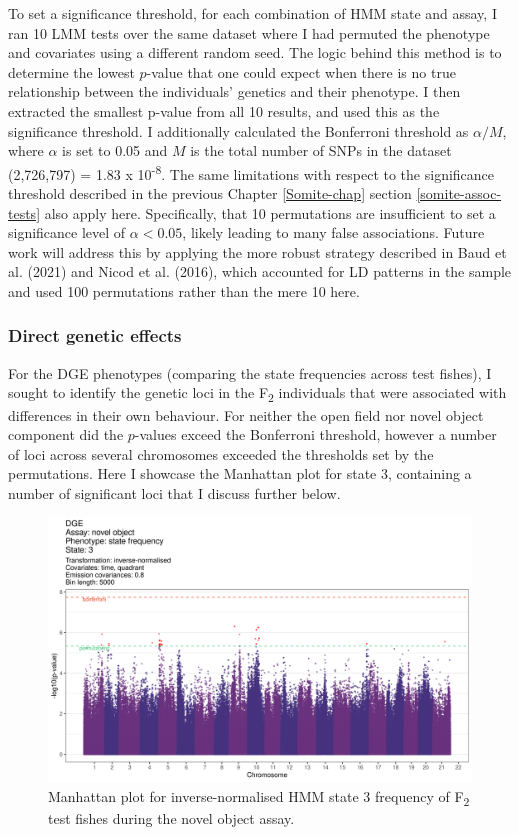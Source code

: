 \documentclass[
]{book}
\begin{document}
To set a significance threshold, for each combination of HMM state and assay, I ran 10 LMM tests over the same dataset where I had permuted the phenotype and covariates using a different random seed. The logic behind this method is to determine the lowest \(p\)-value that one could expect when there is no true relationship between the individuals' genetics and their phenotype. I then extracted the smallest p-value from all 10 results, and used this as the significance threshold. I additionally calculated the Bonferroni threshold as \(\alpha / M\), where \(\alpha\) is set to 0.05 and \(M\) is the total number of SNPs in the dataset (2,726,797) = 1.83 x 10\textsuperscript{-8}. The same limitations with respect to the significance threshold described in the previous Chapter \ref{Somite-chap} section \ref{somite-assoc-tests} also apply here. Specifically, that 10 permutations are insufficient to set a significance level of \(\alpha < 0.05\), likely leading to many false associations. Future work will address this by applying the more robust strategy described in Baud et al. (2021) and Nicod et al. (2016), which accounted for LD patterns in the sample and used 100 permutations rather than the mere 10 here.

\hypertarget{direct-genetic-effects-2}{%
\subsubsection{Direct genetic effects}\label{direct-genetic-effects-2}}

For the DGE phenotypes (comparing the state frequencies across test fishes), I sought to identify the genetic loci in the F\textsubscript{2} individuals that were associated with differences in their own behaviour. For neither the open field nor novel object component did the \(p\)-values exceed the Bonferroni threshold, however a number of loci across several chromosomes exceeded the thresholds set by the permutations. Here I showcase the Manhattan plot for state 3, containing a number of significant loci that I discuss further below.



\begin{figure}
\includegraphics[width=1\linewidth]{figs/mikk_behaviour/manhattans/dge_no_3_time-quadrant} \caption{Manhattan plot for inverse-normalised HMM state 3 frequency of F\textsubscript{2} test fishes during the novel object assay.}\label{fig:F2-man-dge-no-3}
\end{figure}
\end{document}
